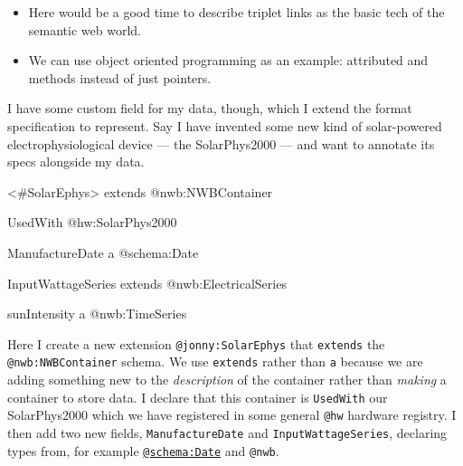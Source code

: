 \documentclass[10pt]{article}
\newenvironment{Shaded}{}{}
\newcommand{\NormalTok}[1]{#1}
\begin{document}
\begin{multicols}{2}
\begin{itemize}

\item
  Here would be a good time to describe triplet links as the basic tech
  of the semantic web world.
\item
  We can use object oriented programming as an example: attributed and
  methods instead of just pointers.
\end{itemize}

I have some custom field for my data, though, which I extend the format
specification to represent. Say I have invented some new kind of
solar-powered electrophysiological device --- the SolarPhys2000 --- and
want to annotate its specs alongside my data.

\begin{Shaded}
\begin{Highlighting}[]
\NormalTok{\textless{}\#SolarEphys\textgreater{}}
\NormalTok{  extends @nwb:NWBContainer}
    
\NormalTok{  UsedWith @hw:SolarPhys2000}

\NormalTok{  ManufactureDate}
\NormalTok{    a @schema:Date}

\NormalTok{  InputWattageSeries}
\NormalTok{    extends @nwb:ElectricalSeries}

\NormalTok{    sunIntensity}
\NormalTok{      a @nwb:TimeSeries}
\end{Highlighting}
\end{Shaded}

Here I create a new extension \texttt{@jonny:SolarEphys} that
\texttt{extends} the \texttt{@nwb:NWBContainer} schema. We use
\texttt{extends} rather than \texttt{a} because we are adding something
new to the \emph{description} of the container rather than \emph{making}
a container to store data. I declare that this container is
\texttt{UsedWith} our SolarPhys2000 which we have registered in some
general \texttt{@hw} hardware registry. I then add two new fields,
\texttt{ManufactureDate} and \texttt{InputWattageSeries}, declaring
types from, for example
\href{https://schema.org/Date}{\texttt{@schema:Date}} and \texttt{@nwb}.


\end{multicols}
\end{document}
